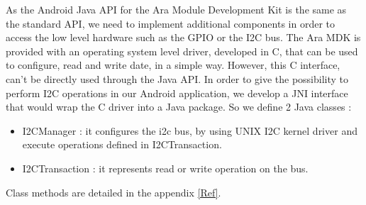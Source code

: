 As the Android Java API for the Ara Module Development Kit is the same as the standard API, we need to implement additional components in order to access the low level hardware such as the GPIO or the I2C bus.
The Ara MDK is provided with an operating system level driver, developed in C, that can be used to configure, read and write date, in a simple way.
However, this C interface, can't be directly used through the Java API. In order to give the possibility to perform I2C operations in our Android application, we develop a JNI interface that would wrap the C driver into a Java package.
So we define 2 Java classes : 
\begin{itemize}
\item I2CManager : it configures the i2c bus, by using UNIX I2C kernel driver and execute operations defined in I2CTransaction.
\item I2CTransaction : it represents read or write operation on the bus.
\end{itemize}

Class methods are detailed in the appendix \ref{Ref}.
